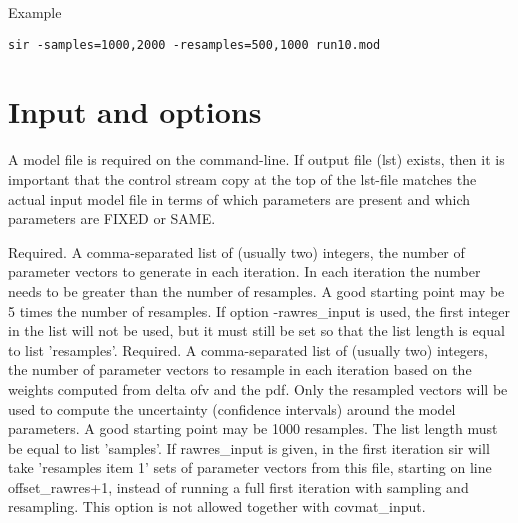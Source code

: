 Example
\begin{verbatim}
sir -samples=1000,2000 -resamples=500,1000 run10.mod
\end{verbatim}

\section{Input and options}
A model file is required on the command-line. 
If output file (lst) exists, then it is important that the control stream copy at the top of the lst-file matches the actual input model file
in terms of which parameters are present and which parameters are FIXED or SAME.
\begin{optionlist}
Required. A comma-separated list of (usually two) integers, the number of parameter vectors to 
generate in each iteration. In each iteration the number needs to be greater than the number 
of resamples. A good starting point may be 5 times the number of resamples.
If option -rawres\_input is used, the first integer in the list will
not be used, but it must still be set so that the list length is equal to
list 'resamples'.
\nextopt
{}
Required. A comma-separated list of (usually two) integers, the number of parameter vectors to resample 
in each iteration based on the weights
computed from delta ofv and the pdf. 
Only the resampled vectors will be used to compute the uncertainty (confidence intervals) around the model parameters. A good starting point may be 1000 resamples.
The list length must be equal to list 'samples'.
\nextopt
{}
If rawres\_input is given, in the first iteration sir will take 'resamples item 1' sets of parameter
vectors from this file, starting on line offset\_rawres+1, instead of
running a full first iteration with sampling and resampling.
This option is not allowed together with covmat\_input. 


\end{optionlist}
